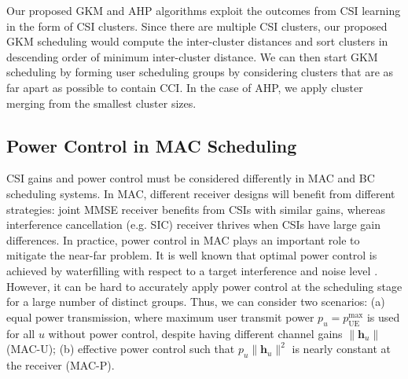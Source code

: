 Our proposed GKM and AHP algorithms exploit the outcomes from CSI learning in the form of CSI clusters.  
Since there are multiple CSI clusters, our proposed GKM scheduling would compute the inter-cluster distances and sort clusters in descending order of minimum inter-cluster distance. 
We can then start GKM scheduling by forming user scheduling groups by considering clusters that are as far apart as possible to contain CCI.  
In the case of AHP, we apply cluster merging from the smallest cluster sizes.


\subsection{Power Control in MAC Scheduling} 

CSI gains and power control must be considered differently in MAC and BC scheduling systems.
In MAC, different receiver designs will benefit from different strategies: 
joint MMSE receiver benefits from CSIs with similar gains, whereas interference cancellation (e.g. SIC) receiver thrives when CSIs have
large gain differences. 
In practice, power control in MAC plays an important role to mitigate the near-far problem. 
It is well known that optimal power control is achieved by waterfilling with respect to a target interference and noise level \cite{Tse05}.
However, it can be hard to accurately apply power control at the scheduling stage for a large number of distinct groups. 
Thus, we can consider two scenarios: (a) equal power transmission, where maximum user transmit power $p_u=p_{\mathrm{UE}}^{\mathrm{max}}$ is used for all $u$ without power control, despite having different channel gains $\|\bm{h}_u\|$ (MAC-U); (b) effective power control such that $p_u\|\bm{h}_u\|^2$ is nearly constant at the receiver (MAC-P). 

